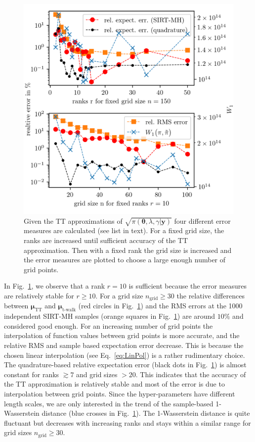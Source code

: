 \begin{figure}[ht!]
	\centering
	\includegraphics[]{findGridRank.png}
	\caption[Optimal rank and number of grid points for TT approximation.]{Given the TT approximations of $\sqrt{\pi( \bm{\theta},\lambda,\gamma  | \bm{y}) }$ four different error measures are calculated (see list in text).
		For a fixed grid size, the ranks are increased until sufficient accuracy of the TT approximation.
		Then with a fixed rank the grid size is increased and the error measures are plotted to choose a large enough number of grid points.}
	\label{fig:FindRankGrid}
\end{figure}
 
In Fig.~\ref{fig:FindRankGrid}, we observe that a rank $r = 10$ is sufficient because the error measures are relatively stable for $r\geq10$.
For a grid size $n_{\text{grid}} \geq 30$ the relative differences between $\bm{\mu}_{\text{TT}}$ and $\bm{\mu}_{\text{t-walk}}$ (red circles in Fig.~\ref{fig:FindRankGrid}) and the RMS errors at the 1000 independent SIRT-MH samples (orange squares in Fig.~\ref{fig:FindRankGrid}) are around $ 10\%$ and considered good enough.
For an increasing number of grid points the interpolation of function values between grid points is more accurate, and the relative RMS and sample based expectation error decrease.
This is because the chosen linear interpolation (see Eq.~\ref{eq:LinPol}) is a rather rudimentary choice.
The quadrature-based relative expectation error (black dots in Fig.~\ref{fig:FindRankGrid}) is almost constant for ranks $ \gtrsim 7$ and grid sizes $ > 20$.
This indicates that the accuracy of the TT approximation is relatively stable and most of the error is due to interpolation between grid points.
Since the hyper-parameters have different length scales, we are only interested in the trend of the sample-based 1-Wasserstein distance (blue crosses in Fig.~\ref{fig:FindRankGrid}). 
The 1-Wasserstein distance is quite fluctuant but decreases with increasing ranks and stays within a similar range for grid sizes $n_{\text{grid}} \geq 30$.


